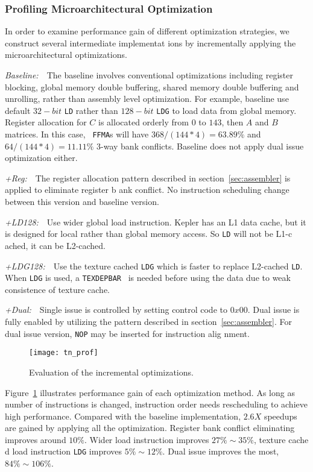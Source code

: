 \subsubsection{Profiling Microarchitectural Optimization}
In order to examine performance gain of different optimization strategies, we construct several intermediate implementat
ions by incrementally applying the microarchitectural optimizations.

{\it Baseline:}~~The baseline involves conventional optimizations including register blocking, global
memory double buffering, shared memory double buffering and unrolling, rather than assembly level optimization.
For example, baseline use default $32-bit$ {\tt LD} rather than $128-bit$ {\tt LDG} to load data from global memory.
Register allocation for $C$ is allocated orderly from $0$ to $143$, then $A$ and $B$ matrices. In this case, {\tt
FFMA}s will have $368/(144*4)=63.89\%$ and $64/(144*4)=11.11\%$ 3-way bank conflicts. Baseline does not apply dual
issue optimization either.

{\it +Reg:}~~The register allocation pattern described in section~\ref{sec:assembler} is applied to eliminate register b
ank conflict. No
instruction scheduling change between this version and baseline version.

{\it +LD128:}~~Use wider global load instruction.
Kepler has an L1 data cache, but it is designed for local rather than global memory access. So {\tt LD} will not be L1-c
ached, it can be L2-cached.

{\it +LDG128:}~~Use the texture cached {\tt LDG} which is faster to replace L2-cached {\tt LD}. When {\tt LDG} is used, 
a {\tt TEXDEPBAR}~\cite{lukyanov2014efficient} is needed before using the data due to weak consistence of texture cache.

{\it +Dual:}~~Single issue is controlled by setting control code to $0x00$. Dual issue is fully enabled by utilizing the
pattern described in section~\ref{sec:assembler}. For dual issue version, {\tt NOP} may be inserted for instruction alig
nment.

\begin{figure}[htbp]
\begin{center}
\texttt{[image: tn\_prof]}
    \caption{Evaluation of the incremental optimizations.}
\label{fig:th_prof}
\end{center}
\end{figure}

Figure~\ref{fig:th_prof} illustrates performance gain of each optimization method.
As long as number of instructions is changed, instruction order needs rescheduling to achieve high performance.
Compared with the baseline implementation, $2.6X$ speedups are gained by applying all the optimization.
Register bank conflict eliminating improves around $10\%$. Wider load instruction improves $27\%\sim35\%$, texture cache
d
load instruction {\tt LDG} improves $5\%\sim12\%$. Dual issue improves the most, $84\%\sim106\%$.

